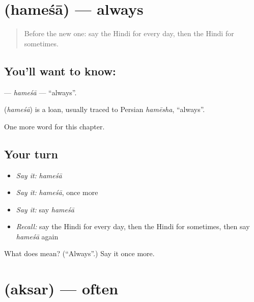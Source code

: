 \section[\texorpdfstring{\hi{हमेशा} (hameśā)}{हमेशा (hameśā)}]{ (hameśā) — always}

\label{lesson:HI-C192-hamesa}



\begin{quote}
Before the new one: say the Hindi for every day, then the Hindi for sometimes.
\end{quote}

\subsection*{You'll want to know: }
\textbf{} — \emph{hameśā} — \textquotedblleft{}always\textquotedblright{}.

\begin{cousinweb}
\textbf{} (\emph{hameśā}) is a loan, usually traced to Persian \emph{hamēsha}, \textquotedblleft{}always\textquotedblright{}.
\end{cousinweb}

\begin{grammarlens}[title={What you've built}]
One more word for this chapter.
\end{grammarlens}

\subsection*{Your turn}
\begin{itemize}
\raggedright
  \item \emph{Say it:} \emph{hameśā}
  \item \emph{Say it:} \emph{hameśā}, once more
  \item \emph{Say it:} say \emph{hameśā}
  \item \emph{Recall:} say the Hindi for every day, then the Hindi for sometimes, then say \emph{hameśā} again
\end{itemize}

\begin{tcolorbox}[breakable,colback=teal!4,colframe=teal!35!black,title={Before you move on}]
What does  mean? (\textquotedblleft{}Always\textquotedblright{}.) Say it once more.
\end{tcolorbox}
\section[\texorpdfstring{\hi{अक्सर} (aksar)}{अक्सर (aksar)}]{ (aksar) — often}

